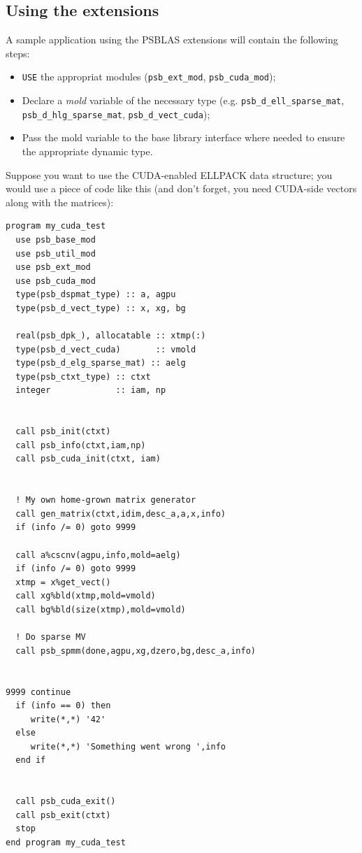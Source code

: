 \subsection{Using the extensions}
\label{sec:ext-appstruct}
A sample application using the PSBLAS extensions will contain the
following steps:
\begin{itemize}
\item \verb|USE| the appropriat modules (\verb|psb_ext_mod|,
  \verb|psb_cuda_mod|);
\item Declare a \emph{mold} variable of the necessary type
  (e.g. \verb|psb_d_ell_sparse_mat|, \verb|psb_d_hlg_sparse_mat|,
  \verb|psb_d_vect_cuda|);
\item Pass the mold variable to the base library interface where
  needed to ensure the appropriate dynamic type.
\end{itemize}
Suppose you want to use the CUDA-enabled ELLPACK data structure; you
would use a piece of code like this (and don't forget, you need
CUDA-side vectors along with the matrices):
\ifpdf
\begin{verbatim}
program my_cuda_test
  use psb_base_mod
  use psb_util_mod 
  use psb_ext_mod
  use psb_cuda_mod
  type(psb_dspmat_type) :: a, agpu
  type(psb_d_vect_type) :: x, xg, bg

  real(psb_dpk_), allocatable :: xtmp(:)
  type(psb_d_vect_cuda)       :: vmold
  type(psb_d_elg_sparse_mat) :: aelg
  type(psb_ctxt_type) :: ctxt
  integer             :: iam, np


  call psb_init(ctxt)
  call psb_info(ctxt,iam,np)
  call psb_cuda_init(ctxt, iam)

  
  ! My own home-grown matrix generator
  call gen_matrix(ctxt,idim,desc_a,a,x,info)
  if (info /= 0) goto 9999

  call a%cscnv(agpu,info,mold=aelg)
  if (info /= 0) goto 9999
  xtmp = x%get_vect() 
  call xg%bld(xtmp,mold=vmold)
  call bg%bld(size(xtmp),mold=vmold)
  
  ! Do sparse MV
  call psb_spmm(done,agpu,xg,dzero,bg,desc_a,info)

 
9999 continue
  if (info == 0) then 
     write(*,*) '42'
  else
     write(*,*) 'Something went wrong ',info
  end if
  
  
  call psb_cuda_exit()
  call psb_exit(ctxt)
  stop
end program my_cuda_test
\end{verbatim}
\else
